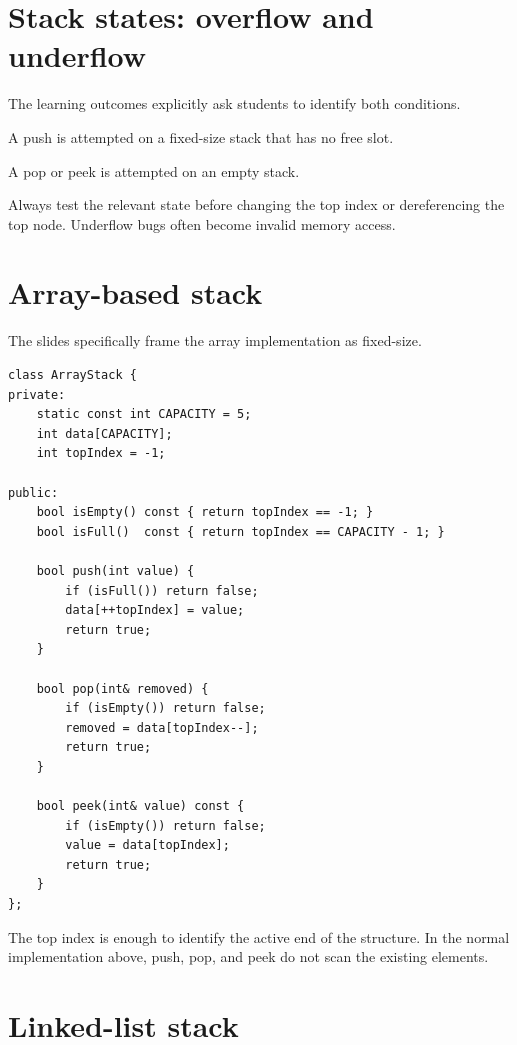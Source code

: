 \section{Stack states: overflow and underflow}

The learning outcomes explicitly ask students to identify both conditions.

\begin{description}[leftmargin=1.35in,style=nextline]
  \item[Overflow] A push is attempted on a fixed-size stack that has no free slot.
  \item[Underflow] A pop or peek is attempted on an empty stack.
\end{description}

\begin{pitfall}
Always test the relevant state before changing the top index or dereferencing the top node. Underflow bugs often become invalid memory access.
\end{pitfall}

\section{Array-based stack}

The slides specifically frame the array implementation as fixed-size.

\begin{lstlisting}
class ArrayStack {
private:
    static const int CAPACITY = 5;
    int data[CAPACITY];
    int topIndex = -1;

public:
    bool isEmpty() const { return topIndex == -1; }
    bool isFull()  const { return topIndex == CAPACITY - 1; }

    bool push(int value) {
        if (isFull()) return false;
        data[++topIndex] = value;
        return true;
    }

    bool pop(int& removed) {
        if (isEmpty()) return false;
        removed = data[topIndex--];
        return true;
    }

    bool peek(int& value) const {
        if (isEmpty()) return false;
        value = data[topIndex];
        return true;
    }
};
\end{lstlisting}

The top index is enough to identify the active end of the structure. In the normal implementation above, push, pop, and peek do not scan the existing elements.

\section{Linked-list stack}

